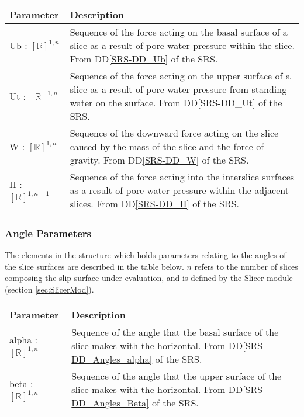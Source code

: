 \documentclass[12pt, titlepage]{article}
\begin{document}
\begin{center}
\begin{longtable}{ p{} 
    p{}}\hline 

  \textbf{Parameter} & \textbf{Description}\\ \hline

  Ub : $[\mathbb{R}]^{1,n}$ & Sequence of the force acting on the
  basal surface of a slice as a result of pore water pressure within
  the slice. From DD\ref{SRS-DD_Ub} of the SRS.\\
  
  Ut : $[\mathbb{R}]^{1,n}$ & Sequence of the force acting on the
  upper surface of a slice as a result of pore water pressure from standing
  water on the surface. From DD\ref{SRS-DD_Ut} of the SRS.\\

  W : $[\mathbb{R}]^{1,n}$ & Sequence of the downward force acting on
  the slice caused by the mass of the slice and the force of
  gravity. From DD\ref{SRS-DD_W} of the SRS.\\

  H : $[\mathbb{R}]^{1,n-1}$ & Sequence of the force acting into the
  interslice surfaces as a result of pore water pressure within the
  adjacent slices. From DD\ref{SRS-DD_H} of the SRS.\\ \hline
\end{longtable}
\end{center}

\subsubsection{Angle Parameters} \label{Tbl:AngleParam}
\noindent
The elements in the structure which holds parameters relating to 
the angles of the slice surfaces are described in the table below. $n$ refers 
to the number of slices composing the slip surface under evaluation, and is 
defined by the Slicer module (section \ref{sec:SlicerMod}).

\begin{center}
\begin{longtable}{ p{}
    p{}}\hline 
  \textbf{Parameter} & \textbf{Description}\\ \hline

  alpha : $[\mathbb{R}]^{1,n}$ & Sequence of the angle that the basal
  surface of the slice makes with the horizontal. From 
  DD\ref{SRS-DD_Angles_alpha} of the SRS.\\

  beta : $[\mathbb{R}]^{1,n}$ & Sequence of the angle that the upper
  surface of the slice makes with the horizontal. From 
  DD\ref{SRS-DD_Angles_Beta} of the SRS.\\ \hline
\end{longtable}
\end{center}
\end{document}
